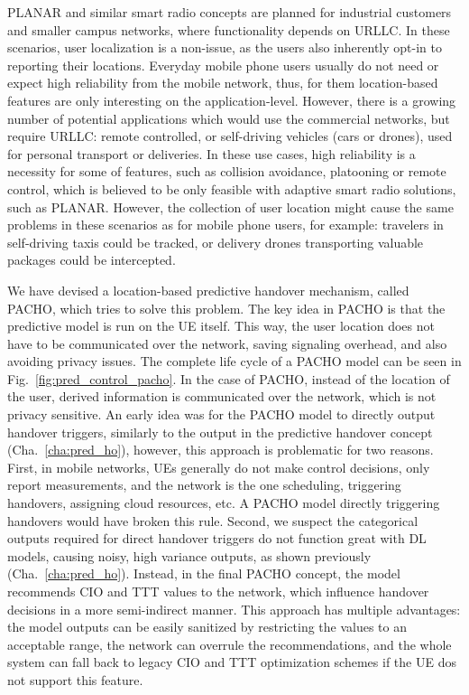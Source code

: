 		\ac{PLANAR} and similar smart radio concepts are planned for industrial customers and smaller campus networks, where functionality depends on \ac{URLLC}.
		In these scenarios, user localization is a non-issue, as the users also inherently opt-in to reporting their locations.
		Everyday mobile phone users usually do not need or expect high reliability from the mobile network, thus, for them location-based features are only interesting on the application-level.
		However, there is a growing number of potential applications which would use the commercial networks, but require \ac{URLLC}: remote controlled, or self-driving vehicles (cars or drones), used for personal transport or deliveries.
		In these use cases, high reliability is a necessity for some of features, such as collision avoidance, platooning or remote control, which is believed to be only feasible with adaptive smart radio solutions, such as \ac{PLANAR}.
		However, the collection of user location might cause the same problems in these scenarios as for mobile phone users, for example: travelers in self-driving taxis could be tracked, or delivery drones transporting valuable packages could be intercepted.
		
		We have devised a location-based predictive handover mechanism, called \ac{PACHO}, which tries to solve this problem.
		The key idea in \ac{PACHO} is that the predictive model is run on the \ac{UE} itself.
		This way, the user location does not have to be communicated over the network, saving signaling overhead, and also avoiding privacy issues.
		The complete life cycle of a \ac{PACHO} model can be seen in Fig.~\ref{fig:pred_control_pacho}.
		In the case of \ac{PACHO}, instead of the location of the user, derived information is communicated over the network, which is not privacy sensitive.
		An early idea was for the \ac{PACHO} model to directly output handover triggers, similarly to the output in the predictive handover concept (Cha.~\ref{cha:pred_ho}), however, this approach is problematic for two reasons.
		First, in mobile networks, \acp{UE} generally do not make control decisions, only report measurements, and the network is the one scheduling, triggering handovers, assigning cloud resources, etc.
		A \ac{PACHO} model directly triggering handovers would have broken this rule.
		Second, we suspect the categorical outputs required for direct handover triggers do not function great with \ac{DL} models, causing noisy, high variance outputs, as shown previously (Cha.~\ref{cha:pred_ho}).
		Instead, in the final \ac{PACHO} concept, the model recommends \ac{CIO} and \ac{TTT} values to the network, which influence handover decisions in a more semi-indirect manner.
		This approach has multiple advantages: the model outputs can be easily sanitized by restricting the values to an acceptable range, the network can overrule the recommendations, and the whole system can fall back to legacy \ac{CIO} and \ac{TTT} optimization schemes if the \ac{UE} dos not support this feature.
		
